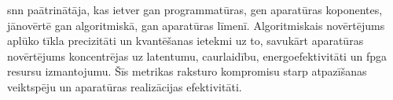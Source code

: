\Gls{snn} paātrinātāja, kas ietver gan programmatūras, gen aparatūras koponentes, jānovērtē gan algoritmiskā, gan aparatūras
līmenī. Algoritmiskais novērtējums aplūko tīkla precizitāti un kvantēšanas ietekmi uz to, savukārt aparatūras novērtējums
koncentrējas uz latentumu, caurlaidību, energoefektivitāti un \Gls{fpga} resursu izmantojumu. Šīs metrikas raksturo
kompromisu starp atpazīšanas veiktspēju un aparatūras realizācijas efektivitāti.


%

